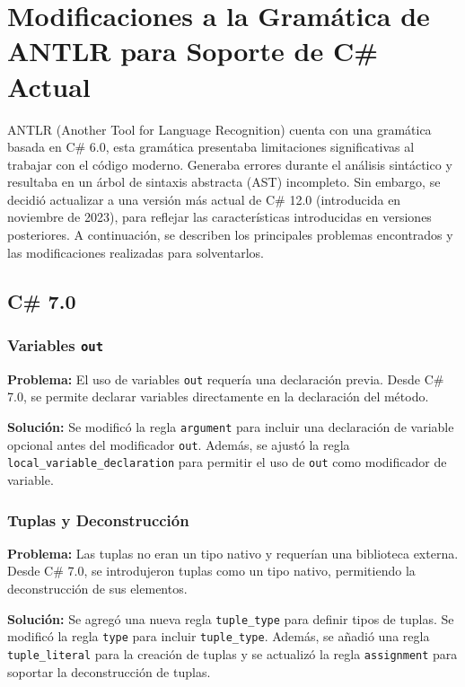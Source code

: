\chapter{Modificaciones a la Gramática de ANTLR para Soporte de C\# Actual}\label{chapter:proposal}

ANTLR (Another Tool for Language Recognition) cuenta con una gramática basada en C\# 6.0, esta gramática presentaba limitaciones significativas al trabajar con el código moderno. Generaba errores durante el análisis sintáctico y resultaba en un árbol de sintaxis abstracta (AST) incompleto. Sin embargo, se decidió actualizar a una versión más actual de C\# 12.0 (introducida en noviembre de 2023), para reflejar las características introducidas en versiones posteriores.  A continuación, se describen los principales problemas encontrados y las modificaciones realizadas para solventarlos.\\

\section{C\# 7.0}

\subsection*{Variables \texttt{out}}
\textbf{Problema:} El uso de variables \texttt{out} requería una declaración previa. Desde C\# 7.0, se permite declarar variables directamente en la declaración del método.

\textbf{Solución:} Se modificó la regla \texttt{argument} para incluir una declaración de variable opcional antes del modificador \texttt{out}. Además, se ajustó la regla \texttt{local\_variable\_declaration} para permitir el uso de \texttt{out} como modificador de variable.

\subsection*{Tuplas y Deconstrucción}
\textbf{Problema:} Las tuplas no eran un tipo nativo y requerían una biblioteca externa. Desde C\# 7.0, se introdujeron tuplas como un tipo nativo, permitiendo la deconstrucción de sus elementos.

\textbf{Solución:} Se agregó una nueva regla \texttt{tuple\_type} para definir tipos de tuplas. Se modificó la regla \texttt{type} para incluir \texttt{tuple\_type}. Además, se añadió una regla \texttt{tuple\_literal} para la creación de tuplas y se actualizó la regla \texttt{assignment} para soportar la deconstrucción de tuplas.

